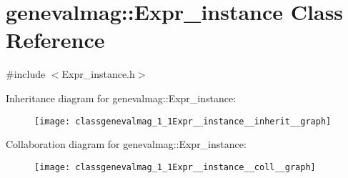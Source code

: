\hypertarget{classgenevalmag_1_1Expr__instance}{
\section{genevalmag::Expr\_\-instance Class Reference}
\label{classgenevalmag_1_1Expr__instance}
}


{\ttfamily \#include $<$Expr\_\-instance.h$>$}



Inheritance diagram for genevalmag::Expr\_\-instance:\nopagebreak
\begin{figure}[H]
\begin{center}
\leavevmode
\texttt{[image: classgenevalmag\_1\_1Expr\_\_instance\_\_inherit\_\_graph]}
\end{center}
\end{figure}


Collaboration diagram for genevalmag::Expr\_\-instance:\nopagebreak
\begin{figure}[H]
\begin{center}
\leavevmode
\texttt{[image: classgenevalmag\_1\_1Expr\_\_instance\_\_coll\_\_graph]}
\end{center}
\end{figure}
